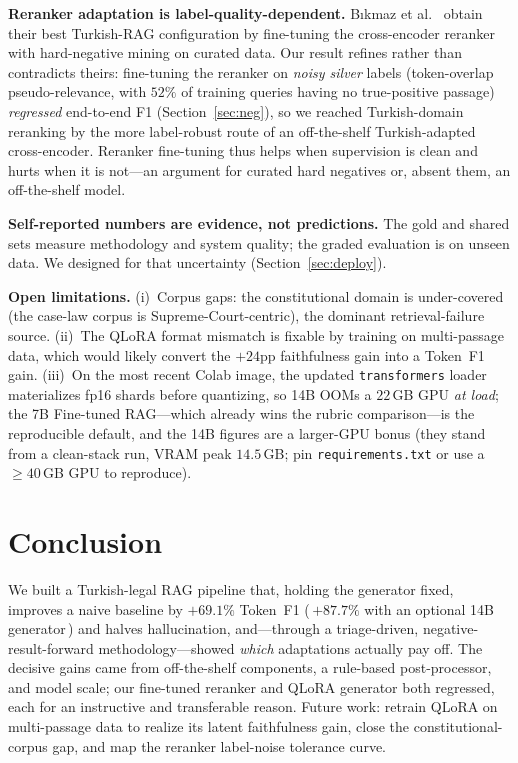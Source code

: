 \documentclass[conference]{IEEEtran}
\begin{document}
\textbf{Reranker adaptation is label-quality-dependent.}
B\i kmaz et al.~\cite{bikmaz2025bridging} obtain their best Turkish-RAG
configuration by fine-tuning the cross-encoder reranker with hard-negative
mining on curated data. Our result refines rather than contradicts theirs:
fine-tuning the reranker on \emph{noisy silver} labels (token-overlap
pseudo-relevance, with $52\%$ of training queries having no true-positive
passage) \emph{regressed} end-to-end F1 (Section~\ref{sec:neg}), so we reached
Turkish-domain reranking by the more label-robust route of an off-the-shelf
Turkish-adapted cross-encoder. Reranker fine-tuning thus helps when supervision
is clean and hurts when it is not---an argument for curated hard negatives or,
absent them, an off-the-shelf model.

\textbf{Self-reported numbers are evidence, not predictions.} The gold and
shared sets measure methodology and system quality; the graded evaluation is on
unseen data. We designed for that uncertainty (Section~\ref{sec:deploy}).

\textbf{Open limitations.} (i)~Corpus gaps: the constitutional domain is
under-covered (the case-law corpus is Supreme-Court-centric), the dominant
retrieval-failure source. (ii)~The QLoRA format mismatch is fixable by training
on multi-passage data, which would likely convert the $+24$pp faithfulness gain
into a Token~F1 gain. (iii)~On the most recent Colab image, the updated
\texttt{transformers} loader materializes fp16 shards before quantizing, so 14B
OOMs a $22$\,GB GPU \emph{at load}; the 7B Fine-tuned RAG---which already wins
the rubric comparison---is the reproducible default, and the 14B figures are a
larger-GPU bonus (they stand from a clean-stack run, VRAM peak $14.5$\,GB; pin
\texttt{requirements.txt} or use a $\geq\!40$\,GB GPU to reproduce).

\section{Conclusion}
We built a Turkish-legal RAG pipeline that, holding the generator fixed,
improves a naive baseline by $+69.1\%$ Token~F1 (\,$+87.7\%$ with an optional
14B generator\,) and halves hallucination, and---through a triage-driven,
negative-result-forward methodology---showed \emph{which} adaptations actually
pay off. The decisive gains came from off-the-shelf components, a rule-based
post-processor, and model scale; our fine-tuned reranker and QLoRA generator
both regressed, each for an instructive and transferable reason. Future work:
retrain QLoRA on multi-passage data to realize its latent faithfulness gain,
close the constitutional-corpus gap, and map the reranker label-noise tolerance
curve.
\end{document}
